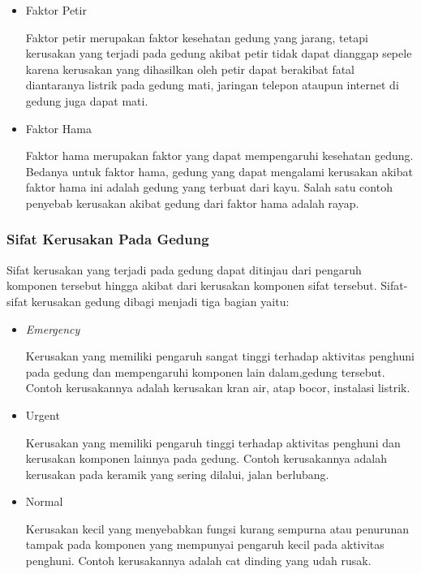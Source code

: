 \begin{itemize}
	\item Faktor Petir
	
	Faktor petir merupakan faktor kesehatan gedung yang jarang, tetapi kerusakan yang terjadi pada gedung akibat petir tidak dapat dianggap sepele karena kerusakan yang dihasilkan oleh petir dapat berakibat fatal diantaranya listrik pada gedung mati, jaringan telepon ataupun internet di gedung juga dapat mati.
	
	\item Faktor Hama
	
	Faktor hama merupakan faktor yang dapat mempengaruhi kesehatan gedung. Bedanya untuk faktor hama, gedung yang dapat mengalami kerusakan akibat faktor hama ini adalah gedung yang terbuat dari kayu. Salah satu contoh penyebab kerusakan akibat gedung dari faktor hama adalah rayap.
	
\end{itemize}  

\subsubsection{Sifat Kerusakan Pada Gedung}
Sifat kerusakan yang terjadi pada gedung dapat ditinjau dari pengaruh komponen tersebut hingga akibat dari kerusakan komponen sifat tersebut. Sifat-sifat kerusakan gedung dibagi menjadi tiga bagian yaitu:

\begin{itemize}
	\item \textit{Emergency}
	
	Kerusakan yang memiliki pengaruh sangat tinggi terhadap aktivitas penghuni pada gedung dan mempengaruhi komponen lain dalam,gedung tersebut. Contoh kerusakannya adalah kerusakan kran air, atap bocor, instalasi listrik.
	
	\item Urgent
	
	Kerusakan yang memiliki pengaruh tinggi terhadap aktivitas penghuni dan kerusakan komponen lainnya pada gedung. Contoh kerusakannya adalah kerusakan pada keramik yang sering dilalui, jalan berlubang.
	
	\item Normal
	
	Kerusakan kecil yang menyebabkan fungsi kurang sempurna atau penurunan tampak pada komponen yang mempunyai pengaruh kecil pada aktivitas penghuni. Contoh kerusakannya adalah cat dinding yang udah rusak.
\end{itemize}

